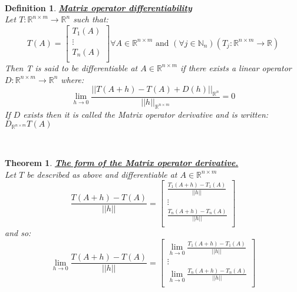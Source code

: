 \documentclass[12pt]{extarticle}
\theoremstyle{plain}
\newtheorem{thm}{Theorem}[section]
\theoremstyle{plain}
\theoremstyle{plain}
\theoremstyle{Definition}
\newtheorem{def.}{Definition}[section]
\theoremstyle{Definition}
\theoremstyle{plain}
\theoremstyle{plain}
\newcommand{\cut}[0]{\noindent\framebox[\linewidth]{\rule{\linewidth}{2pt}}\\}
\begin{document}
\cut
\begin{def.} \underline{\textbf{Matrix operator differentiability}} \\ 
	Let $T : \mathbb{R}^{n\times m} \to \mathbb{R}^n$ such that: \\
	\[
	T(A) = 
	\begin{bmatrix}
	T_1(A) \\ 
	\vdots \\ 
	T_n(A) \\ 	
	\end{bmatrix}
	\forall A \in \mathbb{R}^{n\times m}
	\text{ and } (\forall j \in \mathbb{N}_n)(T_j : \mathbb{R}^{n \times m} \to \mathbb{R})
	\]
	Then T is said to be differentiable at $A \in \mathbb{R}^{n \times m}$ if there exists a linear operator $D : \mathbb{R}^{n \times m} \to \mathbb{R}^n$ where: \\ 
	$$\lim_{h \to 0} \frac{||T(A + h) - T(A) + D(h)||_{\mathbb{R}^n}}{||h||_{\mathbb{R}^{n\times m}}} = 0$$
	If $D$ exists then it is called the Matrix operator derivative and is written: $D_{\mathbb{R}^{n \times m}}T(A)$ \\ 
\end{def.}
\cut
\begin{thm} \underline{\textbf{The form of the Matrix operator derivative.}} \\ 
	Let $T$ be described as above and differentiable at $A \in \mathbb{R}^{n \times m}$ \\ 
	\[
	\frac{T(A + h) - T(A)}{||h||} = 
	\begin{bmatrix}
	\frac{T_1(A + h) - T_1(A)}{||h||} \\ 
	\vdots \\ 
	\frac{T_n(A + h) - T_n(A)}{||h||} \\ 	
	\end{bmatrix}
	\]
	and so: \\ 
	\[
	\lim_{h \to 0} \frac{T(A + h) - T(A)}{||h||} = 
	\begin{bmatrix}
	\lim_{h \to 0} \frac{T_1(A + h) - T_1(A)}{||h||} \\ 
	\vdots \\ 
	\lim_{h \to 0} \frac{T_n(A + h) - T_n(A)}{||h||} \\ 	
	\end{bmatrix}
	\]	
\end{thm}
\cut
\end{document}
